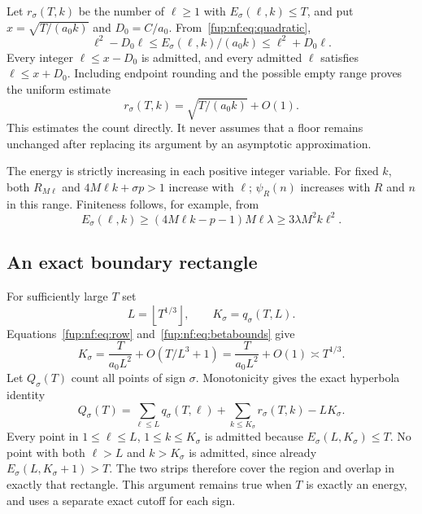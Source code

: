 \documentclass[11pt,letterpaper]{article}
\theoremstyle{definition}\newtheorem{definition}[theorem]{Definition}
\theoremstyle{remark}\newtheorem{remark}[theorem]{Remark}
\newcommand{\floor}[1]{\left\lfloor #1\right\rfloor}
\begin{document}
Let $r_\sigma(T,k)$ be the number of $\ell\ge1$ with $E_\sigma(\ell,k)\le T$, and put $x=\sqrt{T/(a_0k)}$ and $D_0=C/a_0$. From~\eqref{fup:nf:eq:quadratic},
\[
 \ell^2-D_0\ell\le E_\sigma(\ell,k)/(a_0k)
                    \le\ell^2+D_0\ell.
\]
Every integer $\ell\le x-D_0$ is admitted, and every admitted $\ell$ satisfies $\ell\le x+D_0$. Including endpoint rounding and the possible empty range proves the uniform estimate
\begin{equation}\label{fup:nf:eq:column}
 r_\sigma(T,k)=\sqrt{T/(a_0k)}+O(1).
\end{equation}
This estimates the count directly. It never assumes that a floor remains unchanged after replacing its argument by an asymptotic approximation.

The energy is strictly increasing in each positive integer variable. For fixed $k$, both $R_{M\ell}$ and $4M\ell k+\sigma p>1$ increase with $\ell$; $\psi_R(n)$ increases with $R$ and $n$ in this range. Finiteness follows, for example, from
\[
 E_\sigma(\ell,k)\ge(4M\ell k-p-1)M\ell\lambda
                      \ge3\lambda M^2k\ell^2.
\]

\subsection{An exact boundary rectangle}
For sufficiently large $T$ set
\[
 L=\floor{T^{1/3}},\qquad K_\sigma=q_\sigma(T,L).
\]
Equations~\eqref{fup:nf:eq:row} and~\eqref{fup:nf:eq:betabounds} give
\begin{equation}\label{fup:nf:eq:K}
 K_\sigma=\frac{T}{a_0L^2}+O(T/L^3+1)
          =\frac{T}{a_0L^2}+O(1)\asymp T^{1/3}.
\end{equation}
Let $Q_\sigma(T)$ count all points of sign $\sigma$. Monotonicity gives the exact hyperbola identity
\begin{equation}\label{fup:nf:eq:hyperbola}
 Q_\sigma(T)=\sum_{\ell\le L}q_\sigma(T,\ell)
          +\sum_{k\le K_\sigma}r_\sigma(T,k)-LK_\sigma.
\end{equation}
Every point in $1\le\ell\le L$, $1\le k\le K_\sigma$ is admitted because $E_\sigma(L,K_\sigma)\le T$. No point with both $\ell>L$ and $k>K_\sigma$ is admitted, since already $E_\sigma(L,K_\sigma+1)>T$. The two strips therefore cover the region and overlap in exactly that rectangle. This argument remains true when $T$ is exactly an energy, and uses a separate exact cutoff for each sign.
\end{document}
